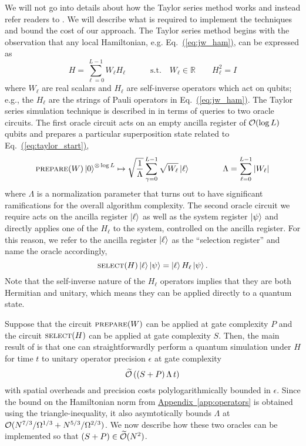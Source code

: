 \documentclass[superscriptaddress,aps,pra,nofootinbib,notitlepage,10pt,longbibliography]{revtex4-1}
\newcommand{\eq}[1]{Eq.~\hyperref[eq:#1]{(\ref*{eq:#1})}}
\DeclareRobustCommand{\app}[1]{\hyperref[app:#1]{Appendix~\ref*{app:#1}}}
\def\ket#1{\mathinner{|{#1}\rangle}}
\begin{document}
We will not go into details about how the Taylor series method works and instead refer readers to \cite{Berry2015}. We will describe what is required to implement the techniques and bound the cost of our approach. The Taylor series method begins with the observation that any local Hamiltonian, e.g. \eq{jw_ham}, can be expressed as
\begin{equation}
\label{eq:taylor_start}
H = \sum_{\ell = 0}^{L - 1} W_\ell H_\ell
\quad \quad \quad
\textrm{s.t.} \quad W_\ell \in \mathbb{R} \quad \quad 
H_{\ell}^{2} = I
\end{equation}
where $W_\ell$ are real scalars and $H_\ell$ are self-inverse operators which act on qubits; e.g., the $H_\ell$ are the strings of Pauli operators in \eq{jw_ham}. The Taylor series simulation technique is described in \cite{Berry2015} in terms of queries to two oracle circuits. The first oracle circuit acts on an empty ancilla register of ${\cal O}(\log L)$ qubits and prepares a particular superposition state related to \eq{taylor_start},
\begin{equation}
\textsc{prepare}(W) \ket{0}^{\otimes \log L} \mapsto \sqrt{\frac{1}{\Lambda}} \sum_{\gamma = 0}^{L - 1} \sqrt{W_\ell} \ket{\ell}
\quad \quad \quad \quad \Lambda = \sum_{\ell = 0}^{L - 1} \left | W_\ell \right |
\end{equation}
where $\Lambda$ is a normalization parameter that turns out to have significant ramifications for the overall algorithm complexity. The second oracle circuit we require acts on the ancilla register $\ket{\ell}$ as well as the system register $\ket{\psi}$ and directly applies one of the $H_\ell$ to the system, controlled on the ancilla register. For this reason, we refer to the ancilla register $\ket{\ell}$ as the ``selection register'' and name the oracle accordingly,
\begin{equation}
\label{eq:selecth}
\textsc{select}(H) \ket{\ell} \ket{\psi} = \ket{\ell} H_\ell \ket{\psi}.
\end{equation}
Note that the self-inverse nature of the $H_\ell$ operators implies that they are both Hermitian and unitary, which means they can be applied directly to a quantum state.

Suppose that the circuit $\textsc{prepare}(W)$ can be applied at gate complexity $P$ and the circuit $\textsc{select}(H)$ can be applied at gate complexity $S$. Then, the main result of \cite{Berry2015} is that one can straightforwardly perform a quantum simulation under $H$ for time $t$ to unitary operator precision $\epsilon$ at gate complexity
\begin{equation}
\label{eq:result}
\widetilde{\cal O}\left(\left(S + P\right) \Lambda \, t\right)
\end{equation}
with spatial overheads and precision costs polylogarithmically bounded in $\epsilon$. Since the bound on the Hamiltonian norm from \app{operators} is obtained using the triangle-inequality, it also asymtotically bounds $\Lambda$ at ${\cal O}(N^{7/3} / \Omega^{1/3} + N^{5/3} / \Omega^{2/3})$. We now describe how these two oracles can be implemented so that $(S + P) \in \widetilde{\cal O}(N^2)$.
\end{document}
